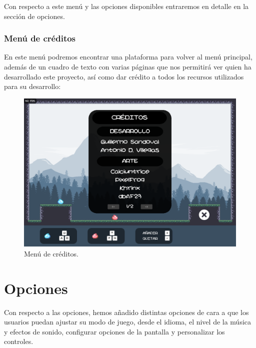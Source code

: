 \documentclass[12pt, spanish]{article}
\begin{document}
Con respecto a este menú y las opciones disponibles entraremos en detalle en la sección de opciones.

\subsubsection{Menú de créditos}

En este menú podremos encontrar una plataforma para volver al menú principal, además de un cuadro de texto con varias páginas que nos permitirá ver quien ha desarrollado este proyecto, así como dar crédito a todos los recursos utilizados para su desarrollo:

\begin{figure}[H]
	\centering
	\includegraphics[width=\textwidth]{"interfaz/creditos.png"}
	\caption{Menú de créditos.}\label{figure:creditos}
\end{figure}

\section{Opciones}

Con respecto a las opciones, hemos añadido distintas opciones de cara a que los usuarios puedan ajustar su modo de juego, desde el idioma, el nivel de la música y efectos de sonido, configurar opciones de la pantalla y personalizar los controles.
\end{document}
